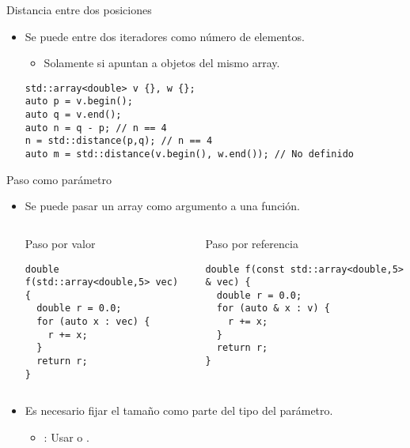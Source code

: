 \begin{frame}[t,fragile]{Distancia entre dos posiciones}
\begin{itemize}
  \item Se puede  entre dos iteradores 
        como número de elementos.
    \begin{itemize}
      \item Solamente si apuntan a objetos del mismo array.
    \end{itemize}
\begin{lstlisting}
std::array<double> v {}, w {};
auto p = v.begin();
auto q = v.end();
auto n = q - p; // n == 4
n = std::distance(p,q); // n == 4
auto m = std::distance(v.begin(), w.end()); // No definido
\end{lstlisting}
\end{itemize}
\end{frame}

\begin{frame}[t,fragile]{Paso como parámetro}
\begin{itemize}
  \item Se puede pasar un array como argumento a una función.

  \begin{columns}[T]

\begin{block}{Paso por valor}
\begin{lstlisting}
double f(std::array<double,5> vec) {
  double r = 0.0;
  for (auto x : vec) {
    r += x;
  }
  return r;
}
\end{lstlisting}
\end{block}

\begin{block}{Paso por referencia}
\begin{lstlisting}
double f(const std::array<double,5> & vec) {
  double r = 0.0;
  for (auto & x : v) {
    r += x;
  }
  return r;
}
\end{lstlisting}
\end{block}
  \end{columns}

  \item Es necesario fijar el tamaño como parte del tipo del parámetro.
    \begin{itemize}
      \item {}: Usar  o 
            .
    \end{itemize}

\end{itemize}
\end{frame}

